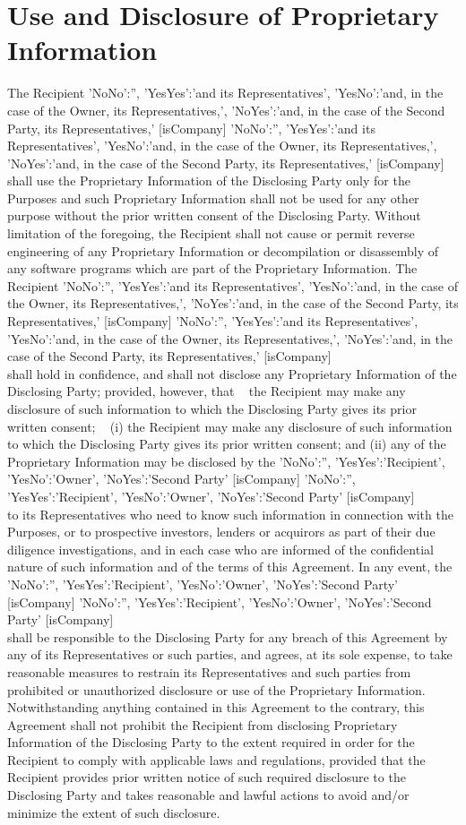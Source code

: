 \documentclass[8pt]{article}
\makeatletter
\edef\history{ }
\newcommand{\VAR}[1]{{\color{blue} #1}\g@addto@macro\history{#1\\}}
\newcommand{\BLOCK}[1]{~\newline{ \color{red}#1 }}
\newcommand{\representativesMention}[1]{
    \VAR{
        {
            'NoNo':'',
            'YesYes':'#1 its Representatives',
            'YesNo':'#1, in the case of the Owner, its Representatives,',
            'NoYes':'#1, in the case of the Second Party, its Representatives,'
        }[isCompany]
    }
}
\newcommand{\representedParty}{
    \VAR{
        {
            'NoNo':'',
            'YesYes':'Recipient',
            'YesNo':'Owner',
            'NoYes':'Second Party'
        }[isCompany]
    }
}
\makeatother
\begin{document}
\section{Use and Disclosure of Proprietary Information} \label{sec:discl}
The Recipient \representativesMention{and} shall use the Proprietary Information of the Disclosing Party only for the Purposes and such Proprietary Information shall not be used for any other purpose without the prior written consent of the Disclosing Party. Without limitation of the foregoing, the Recipient shall not cause or permit reverse engineering of any Proprietary Information or decompilation or disassembly of any software programs which are part of the Proprietary Information.
The Recipient \representativesMention{and} shall hold in confidence, and shall not disclose any Proprietary Information of the Disclosing Party; provided, however, that
\BLOCK{ if isCompany == 'NoNo' }
the Recipient may make any disclosure of such information to which the Disclosing Party gives its prior written consent;
\BLOCK{ else }
(i) the Recipient may make any disclosure of such information to which the Disclosing Party gives its prior written consent; and (ii) any of the Proprietary Information may be disclosed by the \representedParty to its Representatives who need to know such information in connection with the Purposes, or to prospective investors, lenders or acquirors as part of their due diligence investigations, and in each case who are informed of the confidential nature of such information and of the terms of this Agreement. In any event, the \representedParty shall be responsible to the Disclosing Party for any breach of this Agreement by any of its Representatives or such parties, and agrees, at its sole expense, to take reasonable measures to restrain its Representatives and such parties from prohibited or unauthorized disclosure or use of the Proprietary Information.
\BLOCK{ endif }
Notwithstanding anything contained in this Agreement to the contrary, this Agreement shall not prohibit the Recipient from disclosing Proprietary Information of the Disclosing Party to the extent required in order for the Recipient to comply with applicable laws and regulations, provided that the Recipient provides prior written notice of such required disclosure to the Disclosing Party and takes reasonable and lawful actions to avoid and/or minimize the extent of such disclosure.
\end{document}
